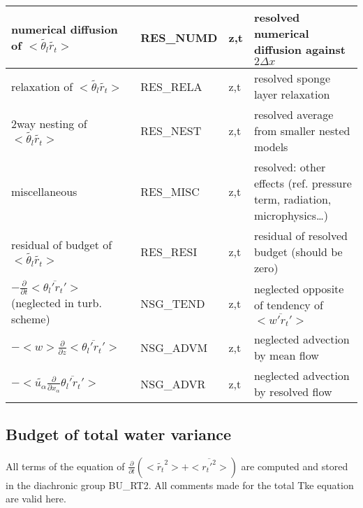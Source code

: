 \begin{longtable}[c]{|p{}|p{}|p{}|p{}|}
{\rm numerical diffusion of } $<\tilde{\theta_l}\tilde{r_t}>$       & RES\_NUMD & z,t & resolved numerical diffusion against $2\Delta x$ \\\hline
{\rm relaxation of }$<\tilde{\theta_l}\tilde{r_t}>$                 & RES\_RELA & z,t & resolved sponge layer relaxation \\\hline
{\rm 2way nesting of }$<\tilde{\theta_l}\tilde{r_t}>$               & RES\_NEST & z,t & resolved average from smaller nested models \\\hline
{\rm miscellaneous}                                                 & RES\_MISC & z,t & resolved: other effects (ref. pressure term, radiation, microphysics\ldots) \\\hline
{\rm residual of budget of} $<\tilde{\theta_l}\tilde{r_t}>$         & RES\_RESI & z,t & residual of resolved budget (should be zero) \\\hline
$-\frac{\partial }{\partial t}<\overline{\theta_l'r_t'}>$ (neglected in turb. scheme) & NSG\_TEND & z,t & neglected opposite of tendency of $<\overline{w'r_t'}>$ \\\hline
$-<w>\frac{\partial}{\partial z}<\overline{\theta_l'r_t'}>$         & NSG\_ADVM & z,t & neglected advection by mean flow \\\hline
$-<\tilde{u_\alpha}\frac{\partial}{\partial x_\alpha}\overline{\theta_l'r_t'}>$  & NSG\_ADVR & z,t & neglected advection by resolved flow \\\hline
\end{longtable}
\endgroup


\subsection{Budget of total water variance}


All terms of the equation of $\frac{\partial}{\partial t} (<\tilde{r_t}^2> + <\overline{r_t'^2}>)$ are
computed and stored in the diachronic group BU\_RT2. 
All comments made for the total Tke equation are valid here.\\

